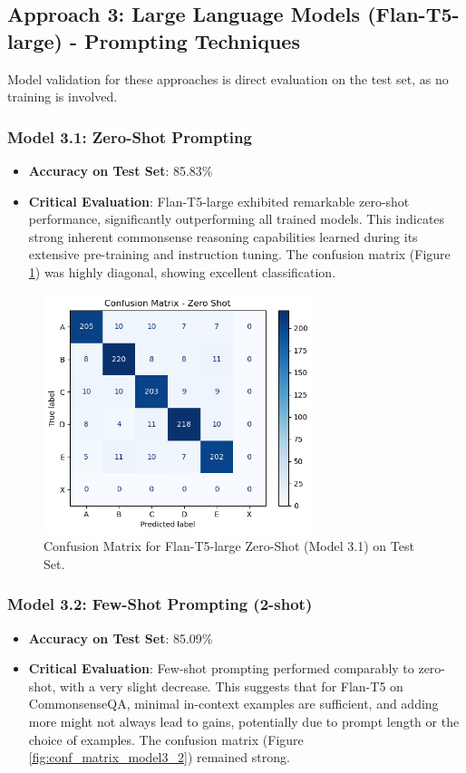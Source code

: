 \documentclass[10.5pt]{article}
\begin{document}
\subsection{Approach 3: Large Language Models (Flan-T5-large) - Prompting Techniques}
Model validation for these approaches is direct evaluation on the test set, as no training is involved.

\subsubsection{Model 3.1: Zero-Shot Prompting}
\begin{itemize}
    \item \textbf{Accuracy on Test Set}: 85.83\%
    \item \textbf{Critical Evaluation}: Flan-T5-large exhibited remarkable zero-shot performance, significantly outperforming all trained models. This indicates strong inherent commonsense reasoning capabilities learned during its extensive pre-training and instruction tuning. The confusion matrix (Figure \ref{fig:conf_matrix_model3_1}) was highly diagonal, showing excellent classification.
\end{itemize}

\begin{figure}[htbp]
    \centering
    \includegraphics[width=0.7\textwidth]{images/model3_1_confusion_matrix.png}
    \caption{Confusion Matrix for Flan-T5-large Zero-Shot (Model 3.1) on Test Set.}
    \label{fig:conf_matrix_model3_1}
\end{figure}

\subsubsection{Model 3.2: Few-Shot Prompting (2-shot)}
\begin{itemize}
    \item \textbf{Accuracy on Test Set}: 85.09\%
    \item \textbf{Critical Evaluation}: Few-shot prompting performed comparably to zero-shot, with a very slight decrease. This suggests that for Flan-T5 on CommonsenseQA, minimal in-context examples are sufficient, and adding more might not always lead to gains, potentially due to prompt length or the choice of examples. The confusion matrix (Figure \ref{fig:conf_matrix_model3_2}) remained strong.
\end{itemize}
\end{document}
